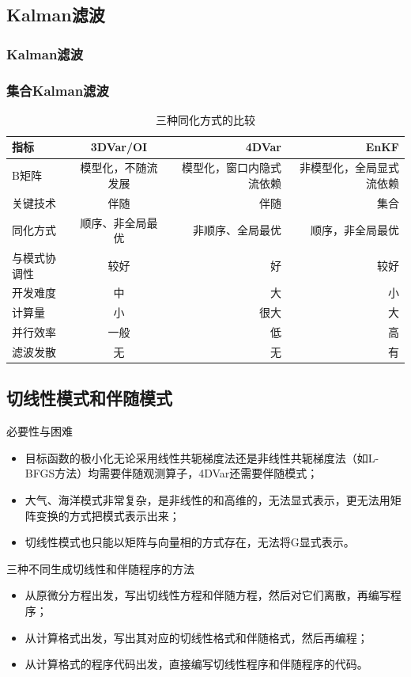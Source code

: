 \documentclass{article}
\begin{document}
\subsection{Kalman滤波}
\subsubsection{Kalman滤波}
\subsubsection{集合Kalman滤波}
\begin{table}[h!]
  \begin{center}
    \caption{三种同化方式的比较}
    \begin{tabular}{l|c|r|r} 
      \textbf{指标} & \textbf{3DVar/OI} & \textbf{4DVar} & \textbf{EnKF}\\
      \hline
      B矩阵 & 模型化，不随流发展 & 模型化，窗口内隐式流依赖 & 非模型化，全局显式流依赖 \\
      关键技术 & 伴随 & 伴随 & 集合\\
      同化方式 & 顺序、非全局最优 & 非顺序、全局最优 & 顺序，非全局最优\\
      与模式协调性 & 较好 & 好 &  较好\\
      开发难度&中&大&小\\
      计算量&小&很大&大\\
      并行效率&一般&低&高\\
      滤波发散&无&无&有
    \end{tabular}
  \end{center}
  \end{table}

\subsection{切线性模式和伴随模式}
必要性与困难
\begin{itemize}
    \item 目标函数的极小化无论采用线性共轭梯度法还是非线性共轭梯度法（如L-BFGS方法）均需要伴随观测算子，4DVar还需要伴随模式；
    \item 大气、海洋模式非常复杂，是非线性的和高维的，无法显式表示，更无法用矩阵变换的方式把模式表示出来；
    \item 切线性模式也只能以矩阵与向量相的方式存在，无法将G显式表示。
\end{itemize}

三种不同生成切线性和伴随程序的方法
\begin{itemize}
    \item 从原微分方程出发，写出切线性方程和伴随方程，然后对它们离散，再编写程序；
    \item 从计算格式出发，写出其对应的切线性格式和伴随格式，然后再编程；
    \item 从计算格式的程序代码出发，直接编写切线性程序和伴随程序的代码。
\end{itemize}
\end{document}

